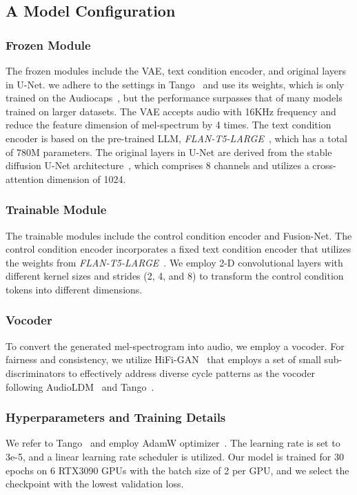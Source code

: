 \documentclass[letterpaper]{article} %
\begin{document}
\subsection{A Model Configuration}

\subsubsection{Frozen Module} The frozen modules include the VAE, text condition encoder, and original layers in U-Net. we adhere to the settings in Tango~\cite{ghosal2023tango} and use its weights, which is only trained on the Audiocaps~\cite{kim2019audiocaps}, but the performance surpasses that of many models trained on larger datasets. The VAE accepts audio with 16KHz
frequency and reduce the feature dimension of mel-spectrum by 4 times. The text condition encoder is based on the pre-trained LLM, \textit{FLAN-T5-LARGE}~\cite{chung2022siflm}, which has a total of 780M parameters. The original layers in U-Net are derived from the stable diffusion U-Net architecture~\cite{ronneberger2015unet,rombach2021highresolution}, which comprises 8 channels and utilizes a cross-attention dimension of 1024.

\subsubsection{Trainable Module} The trainable modules include the control condition encoder and Fusion-Net. The control condition encoder incorporates a fixed text condition encoder that utilizes the weights from \textit{FLAN-T5-LARGE}~\cite{chung2022siflm}.  We employ 2-D convolutional layers with different kernel sizes and strides (2, 4, and 8) to transform the control condition tokens into different dimensions.

\subsubsection{Vocoder} To convert the generated mel-spectrogram into audio, we employ a vocoder. For fairness and consistency, we utilize HiFi-GAN~\cite{kong2020hifigan} that employs a set of small sub-discriminators to effectively address diverse cycle patterns as the vocoder following AudioLDM~\cite{liu2023audioldm} and Tango~\cite{ghosal2023tango}.

\subsubsection{Hyperparameters and Training Details} We refer to Tango~\cite{ghosal2023tango} and employ AdamW optimizer~\cite{loshchilov2017decoupledwd}. The learning rate is set to 3e-5, and a linear learning rate scheduler is utilized. Our model is trained for 30 epochs on 6 RTX3090 GPUs with the batch size of 2 per GPU, and we select the checkpoint with the lowest validation loss.
\end{document}
